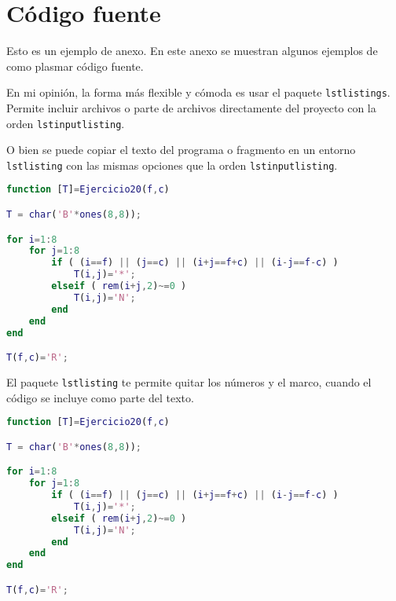 \section{Código fuente} 
\label{sec:codigo-fuente}

Esto es un ejemplo de anexo. En este anexo se muestran algunos ejemplos de como plasmar código fuente.

En mi opinión, la forma más flexible y cómoda es usar el paquete \texttt{lstlistings}.  Permite incluir archivos o parte de archivos directamente del proyecto con la orden \texttt{lstinputlisting}.



O bien se puede copiar el texto del programa o fragmento en un entorno \texttt{lstlisting} con las mismas opciones que la orden \texttt{lstinputlisting}.

\begin{lstlisting}[language=Matlab,
    caption={Ejercicio 20 como texto en línea.},
    label=src:ej20-online
]
function [T]=Ejercicio20(f,c)

T = char('B'*ones(8,8));

for i=1:8
    for j=1:8
        if ( (i==f) || (j==c) || (i+j==f+c) || (i-j==f-c) )
            T(i,j)='*';
        elseif ( rem(i+j,2)~=0 )
            T(i,j)='N';
        end
    end
end

T(f,c)='R';
\end{lstlisting}


\noindent El paquete \texttt{lstlisting} te permite quitar los números y el marco, cuando el código se incluye como parte del texto. 

\begin{lstlisting}[language=Matlab,
    frame=none,numbers=none
]
function [T]=Ejercicio20(f,c)

T = char('B'*ones(8,8));

for i=1:8
    for j=1:8
        if ( (i==f) || (j==c) || (i+j==f+c) || (i-j==f-c) )
            T(i,j)='*';
        elseif ( rem(i+j,2)~=0 )
            T(i,j)='N';
        end
    end
end

T(f,c)='R';
\end{lstlisting}

